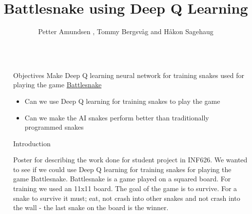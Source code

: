\documentclass[final]{beamer}
\title{Battlesnake using Deep Q Learning} %
\author{Petter Amundsen , Tommy Bergsvåg and Håkon Sagehaug  } %
\institute{Bouvet} %
\newlength{\sepwid}
\newlength{\onecolwid}
\begin{document}

\setlength{\belowcaptionskip}{2ex} %
\setlength\belowdisplayshortskip{2ex} %

\begin{frame}[t] %

\begin{columns}[t] %

\begin{column}{\sepwid}\end{column} %

\begin{column}{\onecolwid} %


\begin{alertblock}{Objectives}
Make Deep Q learning neural network for training snakes used for playing the game \href{https://play.battlesnake.com/}{Battlesnake}
\begin{itemize}
\item Can we use Deep Q learning for training snakes to play the game
\item Can we make the AI snakes perform better than traditionally programmed snakes
\end{itemize}

\end{alertblock}


\begin{block}{Introduction}

Poster for describing the work done for student project in INF626. We wanted to see if we could use Deep Q learning for training snakes for playing the game Battlesnake. Battlesnake is a game played on a squared board. For training we used an 11x11 board. The goal of the game is to survive. For a snake to survive it must; eat, not crash into other snakes and not crash into the wall - the last snake on the board is the winner. 


\end{block}
\end{column}
\end{columns}
\end{frame}
\end{document}
